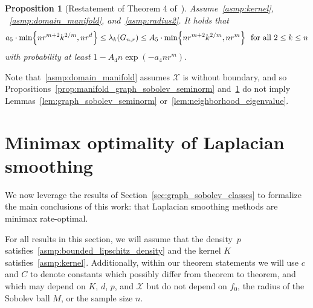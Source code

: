 \documentclass[twoside]{article}
\newcommand{\1}{\mathbf{1}}
\newcommand{\Xset}{\mathcal{X}}
\newtheorem{proposition}{Proposition}
\theoremstyle{definition}
\theoremstyle{remark}
\begin{document}
\begin{proposition}[Restatement of Theorem 4 of~\cite{trillos2019}]
	\label{prop:manifold_neighborhood_eigenvalue}
	Assume~\ref{asmp:kernel}, ~\ref{asmp:domain_manifold}, and~\ref{asmp:radius2}. It holds that
	\begin{equation}
	\label{eqn:manifold_neighborhood_eigenvalue}
	a_5 \cdot \min\Bigl\{nr^{m + 2}k^{2/m},nr^d\Bigr\} \leq \lambda_k(G_{n,r}) \leq A_5 \cdot \min\Bigl\{nr^{m + 2}k^{2/m}, nr^m\Bigr\}~~\textrm{for all $2 \leq k \leq n$}	
	\end{equation}
	with probability at least $1 - A_4n\exp(-a_4nr^m)$.
\end{proposition}
Note that~\ref{asmp:domain_manifold} assumes $\Xset$ is without boundary, and so Propositions~\ref{prop:manifold_graph_sobolev_seminorm} and~\ref{prop:manifold_neighborhood_eigenvalue} do not imply Lemmas~\ref{lem:graph_sobolev_seminorm} or~\ref{lem:neighborhood_eigenvalue}.

\section{Minimax optimality of Laplacian smoothing}
\label{sec:minimax_optimal_laplacian_smoothing}

We now leverage the results of Section~\ref{sec:graph_sobolev_classes} to formalize the main conclusions of this work: that Laplacian smoothing methods are minimax rate-optimal. 

For all results in this section, we will assume that the density~$p$ satisfies~\ref{asmp:bounded_lipschitz_density} and the kernel $K$ satisfies~\ref{asmp:kernel}. Additionally, within our theorem statements we will use $c$ and $C$ to denote constants which possibly differ from theorem to theorem, and which may depend on $K$, $d$, $p$, and $\Xset$ but do not depend on $f_0$, the radius of the Sobolev ball $M$, or the sample size $n$. 
\end{document}
